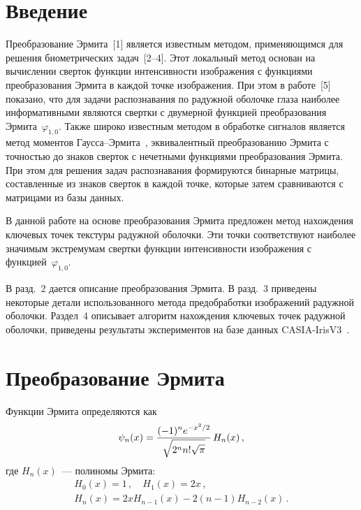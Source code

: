       \begin{multicols}{2}

      \label{st\stat}
      
  

\section{Введение}

Преобразование Эрмита~[1] является известным методом, применяющимся для решения 
биометрических задач~[2--4]. Этот локальный метод основан на вычислении сверток функции 
интенсивности изображения с функциями преобразования Эрмита в каждой точке изображения. 
При этом в работе~[5] показано, что для задачи распознавания по радужной оболочке глаза 
наиболее информативными являются свертки с двумерной функцией 
пре\-об\-разо\-ва\-ния Эрмита~$\varphi_{1,0}$. Также широко известным методом в обработке сигналов является метод 
моментов Гаусса--Эрмита~\cite{2pav}, эквивалентный преобразованию Эрмита с 
точностью до знаков сверток с нечетными функциями преобразования Эрмита. При этом для 
решения задач распознавания формируются бинарные матрицы, составленные из знаков сверток 
в каждой точке, которые затем сравниваются с матрицами из базы данных.
{ %

}

В данной работе на основе преобразования Эрмита предложен метод нахождения ключевых 
точек текстуры радужной оболочки. Эти точки соответствуют наиболее значимым экстремумам 
свертки функции интенсивности изображения с функцией~$\varphi_{1,0}$. 

В разд.~2 дается описание преобразования Эрмита. В разд.~3 приведены некоторые детали 
использованного метода предобработки изображений радужной оболочки. Раздел~4 описывает 
алгоритм нахождения ключевых точек радужной оболочки, приведены результаты 
экспериментов на базе данных CASIA-IrisV3~\cite{6pav}. 

\section{Преобразование Эрмита}

Функции Эрмита определяются как
$$
\psi_n (x) = \displaystyle\frac{\displaystyle (-1)^n e^{-x^2/2}\mathstrut}{\displaystyle \sqrt{2^n n!\sqrt{\pi}}\mathstrut}\,H_n(x)\,,
$$
где $H_n(x)$~--- полиномы Эрмита:
\begin{gather*}
H_0(x) =1\,,\quad H_1(x) =2x\,,\\
H_n(x) =2x H_{n-1}(x) -2(n-1)H_{n-2}(x)\,.
\end{gather*}
      

\end{multicols}
